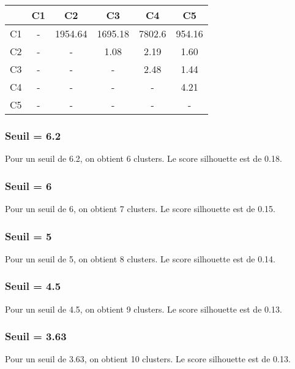 \documentclass{article}
\begin{document}
\begin{tabular}{|c|c|c|c|c|c|}
\hline
& C1 & C2 & C3 & C4 & C5 \\
\hline
C1 & - & 1954.64 & 1695.18 & 7802.6 & 954.16 \\
\hline
C2 & - & - & 1.08 & 2.19 & 1.60 \\
\hline
C3 & - & - & - & 2.48 & 1.44 \\
\hline
C4 & - & - & - & - & 4.21 \\
\hline
C5 & - & - & - & - & - \\
\hline
\end{tabular}

\subsubsection*{Seuil = 6.2}
Pour un seuil de 6.2, on obtient 6 clusters. Le score silhouette est de 0.18.

\subsubsection*{Seuil = 6}
Pour un seuil de 6, on obtient 7 clusters. Le score silhouette est de 0.15.

\subsubsection*{Seuil = 5}
Pour un seuil de 5, on obtient 8 clusters. Le score silhouette est de 0.14.

\subsubsection*{Seuil = 4.5}
Pour un seuil de 4.5, on obtient 9 clusters. Le score silhouette est de 0.13.

\subsubsection*{Seuil = 3.63}
Pour un seuil de 3.63, on obtient 10 clusters. Le score silhouette est de 0.13.
\end{document}
